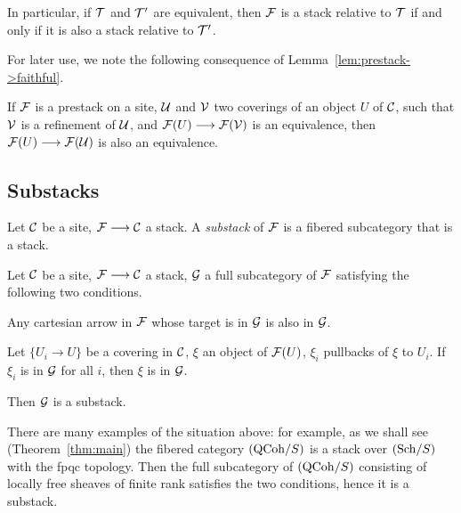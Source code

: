 \begin{4   STACKS}
\begin{4.1 Descent of objects of fibcats}
In particular, if $\mathcal{T}$ and $\mathcal{T}'$ are equivalent, then $\mathcal{F}$ is a stack relative to $\mathcal{T}$ if and only if it is also a stack relative to $\mathcal{T}'$.

For later use, we note the following consequence of Lemma~\ref{lem:prestack->faithful}.

\begin{lemma}\label{lem:pass-to-refinement}
If $\mathcal{F}$ is a prestack on a site, $\mathcal{U}$ and $\mathcal{V}$ two coverings of an object $U$ of $\mathcal{C}$, such that $\mathcal{V}$ is a refinement of $\mathcal{U}$, and $\cF(U) \arr \cF(\cV)$ is an equivalence, then $\cF(U) \arr \cF(\cU)$ is also an equivalence.
\end{lemma}



\subsection{Substacks}


\begin{definition}
Let $\mathcal{C}$ be a site, $\cF \arr \cC$ a stack. A \emph{substack}%
 of $\mathcal{F}$ is a fibered subcategory that is a stack.
\end{definition}

\begin{example}
Let $\mathcal{C}$ be a site, $\cF \arr \cC$ a stack, $\mathcal{G}$ a full subcategory of $\mathcal{F}$ satisfying the following two conditions.

\begin{enumeratei}

\item Any cartesian arrow in $\mathcal{F}$ whose target is in $\mathcal{G}$  is also in $\mathcal{G}$.

\item Let $\{U_i \to U\}$ be a covering in $\mathcal{C}$, $\xi$ an object of $\mathcal{F}(U)$, $\xi_i$ pullbacks of $\xi$ to $U_i$. If $\xi_i$ is in $\mathcal{G}$ for all $i$, then $\xi$ is in $\mathcal{G}$.

\end{enumeratei}

Then $\mathcal{G}$ is a substack.
\end{example}

There are many examples of the situation above: for example, as we shall see (Theorem~\ref{thm:main}) the fibered category $({\mathrm{QCoh}/S})$ is a stack over $({\mathrm{Sch}/S})$ with the fpqc topology. Then the full subcategory of $({\mathrm{QCoh}/S})$ consisting of locally free sheaves of finite rank satisfies the two conditions, hence it is a substack.





\end{4.1 Descent of objects of fibcats}
\end{4   STACKS}
